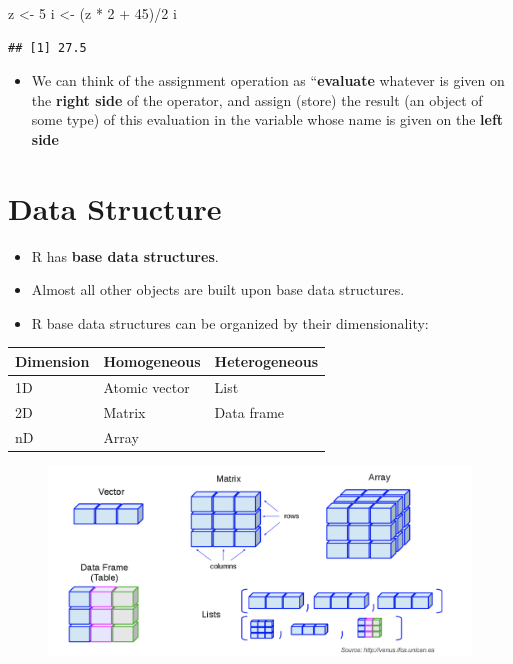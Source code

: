 \documentclass[]{book}
\newenvironment{Shaded}{\begin{snugshade}}{\end{snugshade}}
\newcommand{\DecValTok}[1]{\textcolor[rgb]{0.00,0.00,0.81}{{#1}}}
\newcommand{\StringTok}[1]{\textcolor[rgb]{0.31,0.60,0.02}{{#1}}}
\newcommand{\NormalTok}[1]{{#1}}
\providecommand{\tightlist}{%
  \setlength{\itemsep}{0pt}\setlength{\parskip}{0pt}}
\begin{document}
\begin{Shaded}
\begin{Highlighting}[]
\NormalTok{z <-}\StringTok{ }\DecValTok{5}
\NormalTok{i <-}\StringTok{ }\NormalTok{(z *}\StringTok{ }\DecValTok{2} \NormalTok{+}\StringTok{ }\DecValTok{45}\NormalTok{)/}\DecValTok{2}
\NormalTok{i}
\end{Highlighting}
\end{Shaded}

\begin{verbatim}
## [1] 27.5
\end{verbatim}

\begin{itemize}
\tightlist
\item
  We can think of the assignment operation as ``\textbf{evaluate}
  whatever is given on the \textbf{right side} of the operator, and
  assign (store) the result (an object of some type) of this evaluation
  in the variable whose name is given on the \textbf{left side}
\end{itemize}

\section{Data Structure}\label{data-structure}

\begin{itemize}
\tightlist
\item
  R has \textbf{base data structures}.
\item
  Almost all other objects are built upon base data structures.
\item
  R base data structures can be organized by their dimensionality:
\end{itemize}

\begin{longtable}[]{@{}lll@{}}
\toprule
Dimension & Homogeneous & Heterogeneous\tabularnewline
\midrule
\endhead
1D & Atomic vector & List\tabularnewline
2D & Matrix & Data frame\tabularnewline
nD & Array &\tabularnewline
\bottomrule
\end{longtable}

\begin{figure}[htbp]
\centering
\includegraphics{datastructure.png}
\caption{}
\end{figure}
\end{document}
